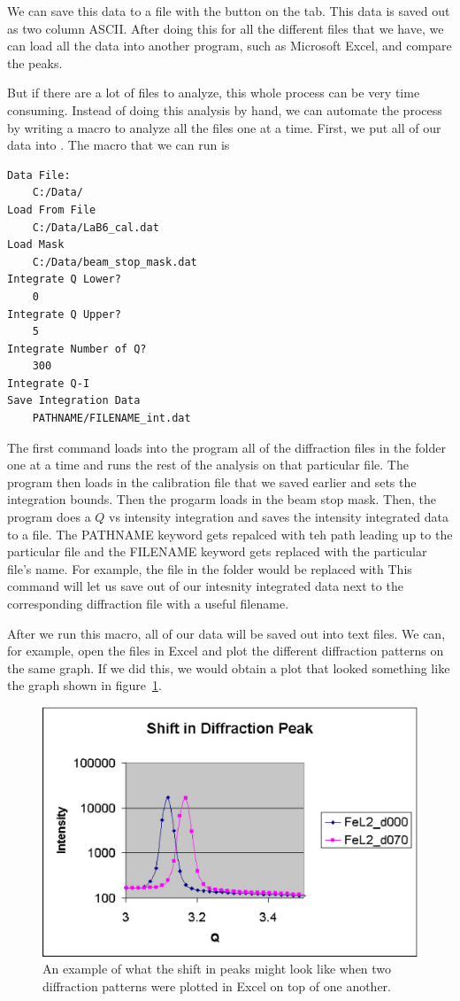We can save this data to a file with the 
button on the  tab. This data is
saved out as two column ASCII.
After doing this for all the different files that
we have, we can load all the data into another program,
such as Microsoft Excel, and compare the peaks.

But if there are a lot of files to analyze, this whole
process can be very time consuming. Instead of doing 
this analysis by hand, we can automate the process by
writing a macro to analyze all the files one at a 
time. First, we put all of our data into .
The macro that we can run is
\begin{lstlisting}[caption={'A macro to automate the 
    analysis'}]
Data File:
	C:/Data/
Load From File
    C:/Data/LaB6_cal.dat
Load Mask
    C:/Data/beam_stop_mask.dat
Integrate Q Lower?
	0
Integrate Q Upper?
	5
Integrate Number of Q?
	300
Integrate Q-I
Save Integration Data
    PATHNAME/FILENAME_int.dat
\end{lstlisting}
The first command loads into the program all of the
diffraction files in the folder 
one at a time and runs the rest of the analysis on
that particular file. The program then loads in
the calibration file that we saved earlier and sets the
integration bounds. Then the progarm loads in the
beam stop mask. Then, the program does a 
$Q$ vs intensity integration and saves the intensity
integrated data to a file. The PATHNAME keyword gets
repalced with teh path leading up to the particular 
file and the FILENAME keyword gets replaced with 
the particular file's name. For example, the file
 in
the folder  would
be replaced with
This command will let us save out of our intesnity
integrated data next to the corresponding diffraction
file with a useful filename.

After we run this macro, all of our data will 
be saved out into text files. We can, for
example, open the files in Excel and plot
the different diffraction patterns on the same
graph. If we did this, we would obtain a plot
that looked something like the graph shown
in figure~\ref{excel_peak_shift}.

\begin{figure}
    \centering
    \includegraphics[scale=.5]{figures/excel_peak_shift.eps}
    \caption{An example of what the shift in peaks might
    look like when two diffraction patterns were plotted
    in Excel on top of one another.}
    \label{excel_peak_shift}
\end{figure}


